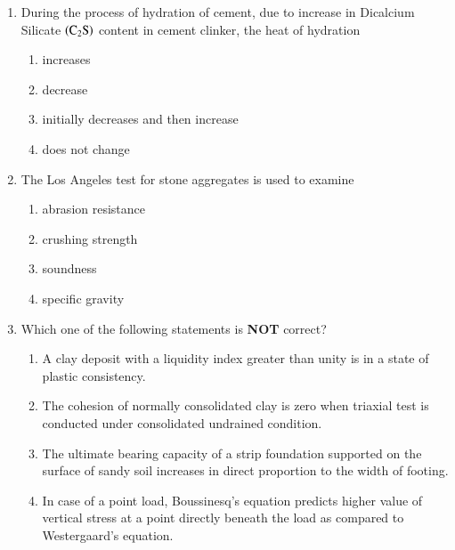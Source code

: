 \documentclass[journal]{IEEEtran}
\begin{document}
\begin{enumerate}
\item During the process of hydration of cement, due to increase in Dicalcium Silicate $\left(\text{C}_2\text{S}\right)$ content in cement clinker, the heat of hydration
\begin{multicols}{2}
    \begin{enumerate}
        \item increases
        \item decrease
        \item initially decreases and then increase
        \item does not change
    \end{enumerate}
\end{multicols}

\item The Los Angeles test for stone aggregates is used to examine
\begin{multicols}{2}
    \begin{enumerate}
        \item abrasion resistance
        \item crushing strength
        \item soundness
        \item specific gravity
    \end{enumerate}
\end{multicols}

\item Which one of the following statements is \textbf{NOT} correct?
\begin{multicols}{2}
    \begin{enumerate}
        \item A clay deposit with a liquidity index greater than unity is in a state of plastic consistency.
        \item The cohesion of normally consolidated clay is zero when triaxial test is conducted under consolidated undrained condition.
        \item The ultimate bearing capacity of a strip foundation supported on the surface of sandy soil increases in direct proportion to the width of footing.
        \item In case of a point load, Boussinesq's equation predicts higher value of vertical stress at a point directly beneath the load as compared to Westergaard's equation.
    \end{enumerate}
\end{multicols}


\end{enumerate}
\end{document}

